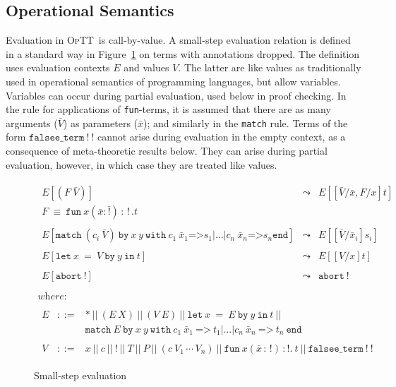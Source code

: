 \documentclass{fundam}
\newcommand{\optt}{\textsc{OpTT}}
\newcommand{\bang}[0]{\texttt{!}}
\begin{document}
\subsection{Operational Semantics}
\label{sec:opsem}

Evaluation in \optt\ is call-by-value.  A small-step evaluation
relation is defined in a standard way in Figure~\ref{fig:eval} on
terms with annotations dropped.  The definition uses evaluation
contexts $E$ and values $V$.  The latter are like values as
traditionally used in operational semantics of programming languages,
but allow variables.  Variables can occur during partial evaluation,
used below in proof checking.  In the rule for applications of
\texttt{fun}-terms, it is assumed that there are as many arguments
($\bar{V}$) as parameters ($\bar{x}$); and similarly in the
\texttt{match} rule.  Terms of the form $\texttt{falsee\_term}\ \bang\ \bang$
cannot arise during evaluation in the empty context, as a consequence
of meta-theoretic results below.  They can arise during partial
evaluation, however, in which case they are treated like values.

\begin{figure}
\[
\begin{array}{l}
\begin{array}{lll}
E[(F\ \bar{V})] & \leadsto &
E[[\bar{V}/\bar{x},F/x]t] \\ 
F \ \equiv\ \texttt{fun}\ x(\bar{x}:\bar{\bang})\,:\,\bang\,.t &\ & \ 
\\ \\
E[ \texttt{match}\ (c_i\ \bar{V})\  \texttt{by}\ x\,y\ \texttt{with}
\ c_1\ \bar{x}_1 \texttt{=>} s_1 | \ldots 
        | c_n\ \bar{x}_n \texttt{=>} s_n \texttt{end}] 
& \leadsto &
E[[\bar{V}/\bar{x}_i]s_i]  \\ \\
E[\texttt{let}\ x\ =\ V\ \texttt{by}\ y\ \texttt{in}\ t] & \leadsto &  
E[[V/x]t] \\ \\
E[\texttt{abort}\ \bang] & \leadsto & \texttt{abort}\ \bang 
\end{array} \\ \\ 
\textit{where:}\\ \\ 
\begin{array}{lll}
E & ::= & *\ ||\ (E\ X)\ ||\ (V\ E)\ ||\  
\texttt{let}\ x\ =\ E\ \texttt{by}\ y \ \texttt{in}\ t\ 
||\\
\ &\ & \texttt{match}\ E\ \texttt{by}\ x\ y \ \texttt{with}\ c_1\ \bar{x}_1\ \texttt{=>}\ t_1 |
 \ldots | c_n\ \bar{x}_n\ \texttt{=>}\ t_n\ \texttt{end} \\ \\
V & ::= & x\ ||\ c\ ||\ \bang\ ||\ T\ ||\ P\ ||\ (c\ V_1\,\cdots\, V_n)\ ||\ \texttt{fun}\ x(\bar{x}\,:\,\bang)\,:\bang .\ t\ ||\ \texttt{falsee\_term}\ \bang\ \bang
\end{array}
\end{array}
\]
\caption{\label{fig:eval}Small-step evaluation}
\end{figure}
\end{document}
